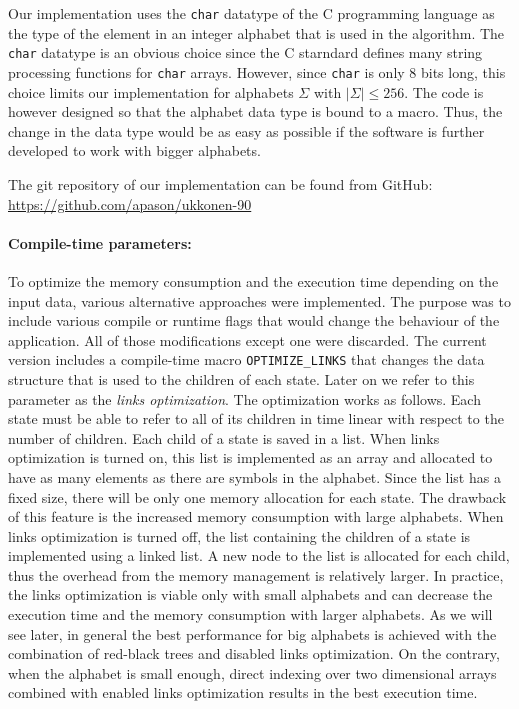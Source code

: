 \documentclass[english,twoside,censored,csm,algorithms-track-2020]{HYthesisML}
\theoremstyle{plain}
\theoremstyle{definition}
\begin{document}
Our implementation uses the \texttt{char} datatype of the C programming language as the
type of the element
in an integer alphabet that is used in the algorithm. The \texttt{char} datatype is an obvious
choice since the C starndard defines many string processing functions for \texttt{char} arrays.
However, since \texttt{char} is only 8 bits long, this choice limits our implementation for alphabets
$\Sigma$ with $|\Sigma| \leq 256$. The code is however designed so that the alphabet data type
is bound to a macro. Thus, the change in the
data type would be as easy as possible if the software is further developed to work with
bigger alphabets. 

The git repository of our implementation can be found from GitHub:\\ \url{https://github.com/apason/ukkonen-90}

\paragraph{Compile-time parameters:}
To optimize the memory consumption and the execution time depending on the input data,
various alternative approaches were implemented.
The purpose was to include various compile or runtime flags that would change the behaviour
of the application. All of those modifications except one were discarded. The current version includes
a compile-time macro \texttt{OPTIMIZE\_LINKS} that changes the data structure that is used to the children of each
state. Later on we refer to this parameter as the {\em links optimization}. The optimization works as follows.
Each state must be able to refer to all of its children in time linear with respect to the number
of children.
Each child of a state is saved in a list. When links optimization is turned on, this list is
implemented as an array and allocated
to have as many elements as there are symbols in the alphabet. Since the list has a fixed size, there
will be only one memory allocation for each state. The drawback of this feature is the increased memory
consumption with large alphabets. When links optimization is turned off, the list containing the
children of a state is implemented using a linked list. A new node to the list is allocated for each
child, thus the overhead from the memory management is relatively larger. In practice, the links
optimization is viable only with small alphabets and can decrease the execution time and the memory
consumption with larger alphabets. As we will see later, in general the best performance for big
alphabets
is achieved with the combination of red-black trees and disabled links optimization. On the contrary,
when the alphabet is small enough, direct indexing over two dimensional arrays combined with
enabled links
optimization results in the best execution time.
\end{document}
